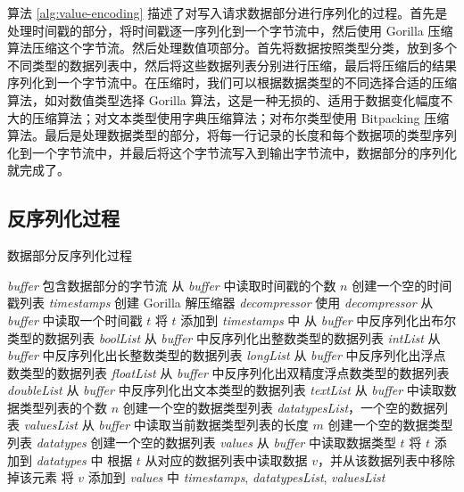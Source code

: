 算法 \ref{alg:value-encoding} 描述了对写入请求数据部分进行序列化的过程。首先是处理时间戳的部分，将时间戳逐一序列化到一个字节流中，然后使用 Gorilla 压缩算法压缩这个字节流。然后处理数值项部分。首先将数据按照类型分类，放到多个不同类型的数据列表中，然后将这些数据列表分别进行压缩，最后将压缩后的结果序列化到一个字节流中。在压缩时，我们可以根据数据类型的不同选择合适的压缩算法，如对数值类型选择 Gorilla 算法，这是一种无损的、适用于数据变化幅度不大的压缩算法；对文本类型使用字典压缩算法；对布尔类型使用 Bitpacking 压缩算法\cite{hwang2023lossless}。最后是处理数据类型的部分，将每一行记录的长度和每个数据项的类型序列化到一个字节流中，并最后将这个字节流写入到输出字节流中，数据部分的序列化就完成了。

\subsection{反序列化过程}
\begin{algorithm}
  \caption{数据部分反序列化过程}
  \label{alg:value-decoding}
  \small
  \begin{algorithmic}
    \REQUIRE \emph{buffer} 包含数据部分的字节流
    \STATE 从 \emph{buffer} 中读取时间戳的个数 $n$
    \STATE 创建一个空的时间戳列表 \emph{timestamps}
    \STATE 创建 Gorilla 解压缩器 \emph{decompressor}
      \STATE 使用 \emph{decompressor} 从 \emph{buffer} 中读取一个时间戳 $t$
      \STATE 将 $t$ 添加到 \emph{timestamps} 中
    \ENDFOR
    \STATE 从 \emph{buffer} 中反序列化出布尔类型的数据列表 \emph{boolList}
    \STATE 从 \emph{buffer} 中反序列化出整数类型的数据列表 \emph{intList}
    \STATE 从 \emph{buffer} 中反序列化出长整数类型的数据列表 \emph{longList}
    \STATE 从 \emph{buffer} 中反序列化出浮点数类型的数据列表 \emph{floatList}
    \STATE 从 \emph{buffer} 中反序列化出双精度浮点数类型的数据列表 \emph{doubleList}
    \STATE 从 \emph{buffer} 中反序列化出文本类型的数据列表 \emph{textList}
    \STATE 从 \emph{buffer} 中读取数据类型列表的个数 $n$
    \STATE 创建一个空的数据类型列表 \emph{datatypesList}，一个空的数据列表 \emph{valuesList}
      \STATE 从 \emph{buffer} 中读取当前数据类型列表的长度 $m$
      \STATE 创建一个空的数据类型列表 \emph{datatypes}
      \STATE 创建一个空的数据列表 \emph{values}
        \STATE 从 \emph{buffer} 中读取数据类型 $t$
        \STATE 将 $t$ 添加到 \emph{datatypes} 中
        \STATE 根据 $t$ 从对应的数据列表中读取数据 $v$，并从该数据列表中移除掉该元素
        \STATE 将 $v$ 添加到 \emph{values} 中
    \ENDFOR
    \ENDFOR
    \RETURN \emph{timestamps}, \emph{datatypesList}, \emph{valuesList}
  \end{algorithmic}
\end{algorithm}

